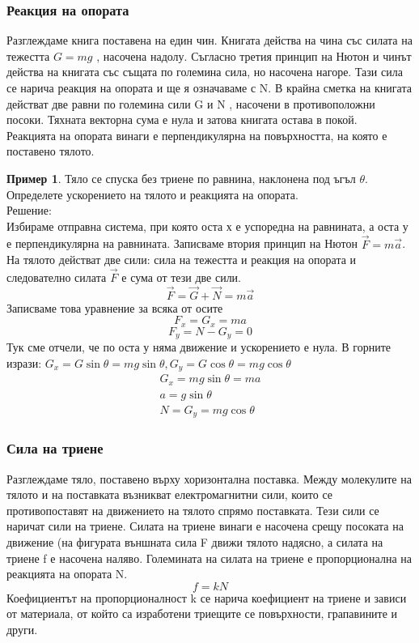 \documentclass[fleqn, 12pt]{article}
\theoremstyle{definition}
\newtheorem{example}{Пример}[subsection]
\begin{document}
\subsubsection{Реакция на опората}
Разглеждаме книга поставена на един чин. Книгата действа на чина със силата на тежестта $G = mg$ , насочена надолу. Съгласно третия принцип на Нютон и чинът действа на книгата със същата по големина сила, но насочена нагоре. Тази сила се нарича реакция на опората и ще я означаваме с N. В крайна сметка на книгата действат две равни по големина сили G и N , насочени в противоположни посоки. Тяхната векторна сума е нула и затова книгата остава в покой. \\
Реакцията на опората винаги е перпендикулярна на повърхността, на която е поставено тялото.
 
\begin{example}
Тяло се спуска без триене по равнина, наклонена под ъгъл $\theta$. Определете ускорението на тялото и реакцията на опората. \\
Решение: \\
Избираме отправна система, при която оста х е успоредна на равнината, а оста у е перпендикулярна на равнината. Записваме втория принцип на Нютон $\vec{F} = m \vec{a}$. На тялото действат две сили: сила на тежестта и реакция на опората и следователно силата $\vec{F}$ е сума от тези две сили.
$$\vec{F} = \vec{G} + \vec{N} = m \vec{a} $$
Записваме това уравнение за всяка от осите
$$F_x = G_x = ma$$
$$F_y = N - G_y = 0$$
Тук сме отчели, че по оста у няма движение и ускорението е нула. В горните изрази: $G_x  =G \sin{\theta} = mg \sin{\theta}, G_y  =G \cos{\theta} = mg \cos{\theta}$\\
\begin{gather*}
G_x = mg \sin{\theta} = ma\\
a =g\sin{\theta}\\
N = G_y = mg \cos{\theta}
\end{gather*}
\end{example}

\subsubsection{Сила на триене}
Разглеждаме тяло, поставено върху хоризонтална поставка. Между молекулите на тялото и на поставката възникват електромагнитни сили, които се противопоставят на движението на тялото спрямо поставката. Тези сили се наричат сили на триене. Силата на триене винаги е насочена срещу посоката на движение (на фигурата външната сила F движи тялото надясно, а силата на триене f е насочена наляво. Големината на силата на триене е пропорционална на реакцията на опората N.
$$f = kN$$
Коефициентът на пропорционалност k се нарича коефициент на триене и зависи от материала, от който са изработени триещите се повърхности, грапавините и други.
\end{document}
